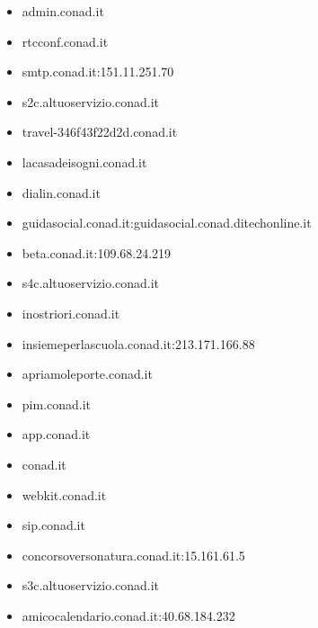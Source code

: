 \documentclass{article}
\begin{document}
\scriptsize
\begin{itemize}
    
        \item admin.conad.it
    
        \item rtcconf.conad.it
    
        \item smtp.conad.it:151.11.251.70
    
        \item s2c.altuoservizio.conad.it
    
        \item travel-346f43f22d2d.conad.it
    
        \item lacasadeisogni.conad.it
    
        \item dialin.conad.it
    
        \item guidasocial.conad.it:guidasocial.conad.ditechonline.it
    
        \item beta.conad.it:109.68.24.219
    
        \item s4c.altuoservizio.conad.it
    
        \item inostriori.conad.it
    
        \item insiemeperlascuola.conad.it:213.171.166.88
    
        \item apriamoleporte.conad.it
    
        \item pim.conad.it
    
        \item app.conad.it
    
        \item conad.it
    
        \item webkit.conad.it
    
        \item sip.conad.it
    
        \item concorsoversonatura.conad.it:15.161.61.5
    
        \item s3c.altuoservizio.conad.it
    
        \item amicocalendario.conad.it:40.68.184.232
    

\end{itemize}
\end{document}
